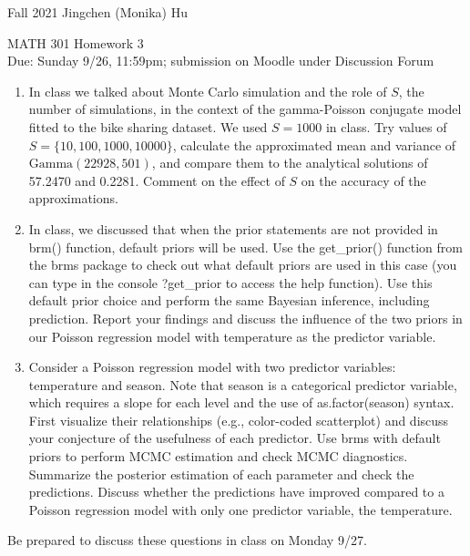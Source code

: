 \documentclass[11pt]{article}
\begin{document}
\enlargethispage{\baselineskip}

Fall 2021 \hfill Jingchen (Monika) Hu\\

\begin{center}
{\huge MATH 301 Homework 3}	\\
Due: Sunday 9/26, 11:59pm; submission on Moodle under Discussion Forum
\end{center}
\vspace{0.5cm}

\begin{enumerate}
\item In class we talked about Monte Carlo simulation and the role of $S$, the number of simulations, in the context of the gamma-Poisson conjugate model fitted to the bike sharing dataset. We used $S = 1000$ in class. Try values of $S = \{10, 100, 1000, 10000\}$, calculate the approximated mean and variance of $\textrm{Gamma}(22928, 501)$, and compare them to the analytical solutions of 57.2470 and 0.2281. Comment on the effect of $S$ on the accuracy of the approximations.


\item In class, we discussed that when the prior statements are not provided in \textrm{brm()} function, default priors will be used. Use the \textrm{get\_prior()} function from the \textrm{brms} package to check out what default priors are used in this case (you can type in the console \textrm{?get\_prior} to access the help function). Use this default prior choice and perform the same Bayesian inference, including prediction. Report your findings and discuss the influence of the two priors in our Poisson regression model with temperature as the predictor variable.

\item Consider a Poisson regression model with two predictor variables: temperature and season. Note that season is a categorical predictor variable, which requires a slope for each level and the use of \textrm{as.factor(season)} syntax. First visualize their relationships (e.g., color-coded scatterplot) and discuss your conjecture of the usefulness of each predictor. Use \textrm{brms} with default priors to perform MCMC estimation and check MCMC diagnostics. Summarize the posterior estimation of each parameter and check the predictions. Discuss whether the predictions have improved compared to a Poisson regression model with only one predictor variable, the temperature.

\end{enumerate}

Be prepared to discuss these questions in class on Monday 9/27.
\end{document}
